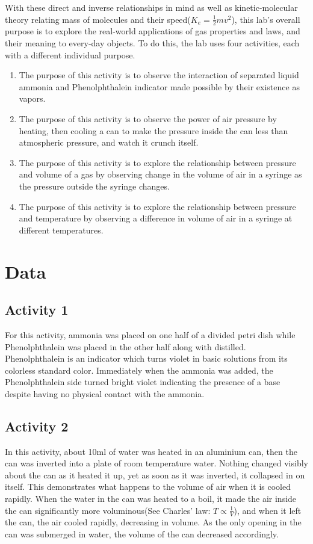 \documentclass{article}
\begin{document}
    With these direct and inverse relationships in mind as well as kinetic-molecular theory relating mass of molecules and their speed($K_e=\frac{1}{2}mv^2$), this lab's overall purpose is to explore the real-world applications of gas properties and laws, and their meaning to every-day objects. To do this, the lab uses four activities, each with a different individual purpose.
    \begin{enumerate}
        \item The purpose of this activity is to observe the interaction of separated liquid ammonia and Phenolphthalein indicator made possible by their existence as vapors.
        \item The purpose of this activity is to observe the power of air pressure by heating, then cooling a can to make the pressure inside the can less than atmospheric pressure, and watch it crunch itself.
        \item The purpose of this activity is to explore the relationship between pressure and volume of a gas by observing change in the volume of air in a syringe as the pressure outside the syringe changes.
        \item The purpose of this activity is to explore the relationship between pressure and temperature by observing a difference in volume of air in a syringe at different temperatures.
    \end{enumerate}
\section{Data}
\subsection{Activity 1}

For this activity, ammonia was placed on one half of a divided petri dish while Phenolphthalein was placed in the other half along with distilled.  Phenolphthalein is an indicator which turns violet in basic solutions from its colorless standard color. Immediately when the ammonia was added, the Phenolphthalein side turned bright violet indicating the presence of a base despite having no physical contact with the ammonia.  
\subsection{Activity 2}

In this activity, about 10ml of water was heated in an aluminium can, then the can was inverted into a plate of room temperature water.  Nothing changed visibly about the can as it heated it up, yet as soon as it was inverted, it collapsed in on itself. This demonstrates what happens to the volume of air when it is cooled rapidly. When the water in the can was heated to a boil, it made the air inside the can significantly more voluminous(See Charles' law: $T\propto \frac{1}{V}$), and when it left the can, the air cooled rapidly, decreasing in volume.  As the only opening in the can was submerged in water, the volume of the can decreased accordingly.
\end{document}
